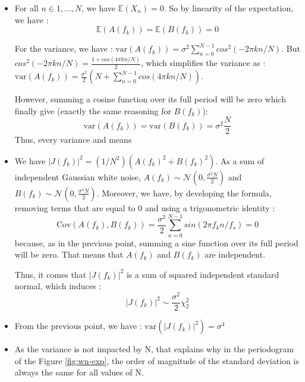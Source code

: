 \documentclass[11pt]{article}
\begin{document}
\begin{solution}
    \begin{itemize}
        \item For all $n\in{1,\dots,N}$, we have $\mathbb{E}(X_n)=0$. So by linearity of the expectation, we have :
        \begin{equation}
            \mathbb{E}(A(f_k))=\mathbb{E}(B(f_k))=0
        \end{equation}

        For the variance, we have : $\text{var}(A(f_k))=\sigma^2\sum_{n=0}^{N-1}cos^2(-2\pi kn/N)$. But $cos^2(-2\pi kn/N)=\frac{1+cos(4\pi kn/N)}{2}$, which simplifies the variance as : $\text{var}(A(f_k))=\frac{\sigma^2}{2}(N+\sum_{n=0}^{N-1}cos(4\pi kn/N))$. 

        However, summing a cosine function over its full period will be zero which finally give (exactly the same reasoning for $B(f_k)$): 
        \begin{equation}
            \text{var}(A(f_k))=\text{var}(B(f_k))=\sigma^2\frac{N}{2}
        \end{equation}
        Thus, every variance and means 
        \item We have $|J(f_k)|^2 = (1/N^2) (A(f_k)^2 + B(f_k)^2)$.
        As a sum of independent Gaussian white noise, $A(f_k)\sim\mathcal{N}(0, \frac{\sigma^2N}{2})$ and $B(f_k)\sim\mathcal{N}(0, \frac{\sigma^2N}{2})$. Moreover, we have, by developing the formula, removing terms that are equal to 0 and using a trigonometric identity : 
        \begin{equation}
            \text{Cov}(A(f_k),B(f_k))=\frac{\sigma^2}{2}\sum_{n=0}^{N-1}sin(2 \pi f_k n/f_s) = 0
        \end{equation}
        because, as in the previous point, summing a sine function over its full period will be zero. That means that $A(f_k)$ and $B(f_k)$ are independent.
        
        Thus, it comes that $|J(f_k)|^2$ is a sum of squared independent standard normal, which induces : 
        \begin{equation}
            |J(f_k)|^2\sim\frac{\sigma^2}{2}\chi_2^2
        \end{equation}
        \item From the previous point, we have : $\text{var}(|J(f_k)|^2)=\sigma^4$
        \item As the variance is not impacted by N, that explains why in the periodogram of the Figure \ref{fig:wn-exp}, the order of magnitude of the standard deviation is always the same for all values of N. 
    \end{itemize}
\end{solution}
\end{document}

